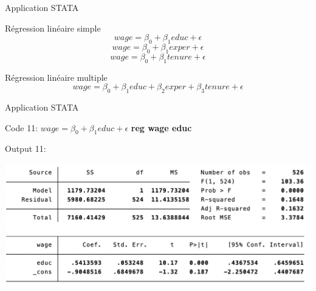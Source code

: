 \documentclass{beamer}
\begin{document}
\begin{frame}{Application STATA}
\begin{block}{Régression linéaire simple}
\begin{equation}
wage = \beta_0 + \beta_1 educ  + \epsilon
\end{equation}
\begin{equation}
wage = \beta_0 + \beta_1 exper  + \epsilon
\end{equation}
\begin{equation}
wage = \beta_0 + \beta_1 tenure  + \epsilon
\end{equation}
\end{block}
\begin{block}{Régression linéaire multiple}
\begin{equation}
wage = \beta_0 + \beta_1 educ +\beta_2 exper + \beta_3 tenure  + \epsilon
\end{equation}
\end{block}
\end{frame}

\begin{frame}{Application STATA}
\begin{block}{Code 11: $wage = \beta_0 + \beta_1 educ  + \epsilon$}
\textbf{reg wage educ}
\end{block}

\begin{block}{Output 11:}
\begin{center}
\includegraphics[scale=.5]{REG1.png}
\end{center}
\end{block}
\end{frame}
\end{document}

